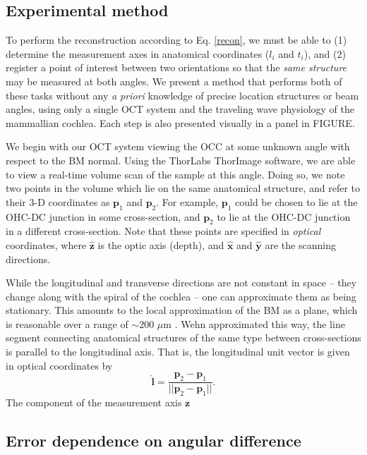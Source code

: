 \documentclass[preprint,NumberedRefs]{JASA}
\begin{document}
\subsection{Experimental method}
\par{To perform the reconstruction according to Eq. \ref{recon}, we must be able to (1) determine the measurement axes in anatomical coordinates ($l_i$ and $t_i$), and (2) register a point of interest between two orientations so that the \textit{same structure} may be measured at both angles. We present a method that performs both of these tasks without any \textit{a priori} knowledge of precise location structures or beam angles, using only a single OCT system and the traveling wave physiology of the mammallian cochlea. Each step is also presented visually in a panel in FIGURE.}
\par{We begin with our OCT system viewing the OCC at some unknown angle with respect to the BM normal. Using the ThorLabs ThorImage software, we are able to view a real-time volume scan of the sample at this angle. Doing so, we note two points in the volume which lie on the same anatomical structure, and refer to their 3-D coordinates as $\mathbf{p}_1$ and $\mathbf{p}_2$. For example, $\mathbf{p}_1$ could be chosen to lie at the OHC-DC junction in some cross-section, and $\mathbf{p}_2$ to lie at the OHC-DC junction in a different cross-section. Note that these points are specified in \textit{optical} coordinates, where $\mathbf{\hat{z}}$ is the optic axis (depth), and $\mathbf{\hat{x}}$ and $\mathbf{\hat{y}}$ are the scanning directions.}
\par{While the longitudinal and transverse directions are not constant in space -- they change along with the spiral of the cochlea -- one can approximate them as being stationary. This amounts to the local approximation of the BM as a plane, which is reasonable over a range of $\sim 200$ $\mu$m \citep{frost2022}. Wehn approximated this way, the line segment connecting anatomical structures of the same type between cross-sections is parallel to the longitudinal axis. That is, the longitudinal unit vector is given in optical coordinates by
\begin{equation}
	\mathbf{\hat{l}} = \frac{\mathbf{p}_2-\mathbf{p}_1}{||\mathbf{p}_2-\mathbf{p}_1||}.
\end{equation}
The component of the measurement axis $\mathbf{z}$}
\subsection{Error dependence on angular difference}
\end{document}
